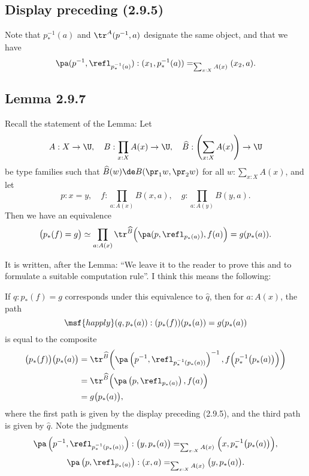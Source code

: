 \documentclass[12pt]{article}
\begin{document}

\subsection{Display preceding (2.9.5)}

Note that $p^{-1}_*(a)$ and $\tr^A(p^{-1},a)$ designate the same object, and that we have 
$$
\pa(p^{-1},\refl_{p^{-1}_*(a)}):(x_1,p^{-1}_*(a))=_{\sum_{x:X}A(x)}(x_2,a).
$$ 


\subsection{Lemma 2.9.7}

Recall the statement of the Lemma: Let 
$$
A:X\to\U,\quad B:\prod_{x:X}A(x)\to\U,\quad\widehat B:\left(\sum_{x:X}A(x)\right)\to\U
$$ 
be type families such that $\widehat B(w)\de B(\pr_1w,\pr_2w)$ for all $w:\sum_{x:X}A(x)$, and let 
$$
p:x=y,\quad f:\prod_{a:A(x)}B(x,a),\quad g:\prod_{a:A(y)}B(y,a).
$$ 
Then we have an equivalence 
$$
\big(p_*(f)=g\big)\simeq\prod_{a:A(x)}\tr^{\widehat B}\Big(\pa(p,\refl_{p_*(a)}),f(a)\Big)=g(p_*(a)).
$$ 

It is written, after the Lemma: ``We leave it to the reader to prove this and to formulate a suitable computation rule''. I think this means the following:

If $q:p_*(f)=g$ corresponds under this equivalence to $\widehat q$, then for $a:A(x)$, the path 
$$
\msf{happly}(q,p_*(a)):(p_*(f))(p_*(a))=g(p_*(a))
$$ 
is equal to the composite 
\begin{align*}
\big(p_*(f)\big)\big(p_*(a)\big)&=\tr^{\widehat B}\bigg(\pa\left(p^{-1},\refl_{p^{-1}_*(p_*(a))}\right)^{-1},f\Big(p^{-1}_*\big(p_*(a)\big)\Big)\bigg)\\ 
&=\tr^{\widehat B}\Big(\pa\left(p,\refl_{p_*(a)}\right),f(a)\Big)\\
&=g\big(p_*(a)\big),
\end{align*}
where the first path is given by the display preceding (2.9.5), and the third path is given by $\widehat q$. Note the judgments
$$
\pa\left(p^{-1},\refl_{p^{-1}_*(p_*(a))}\right):\big(y,p_*(a)\big)=_{\sum_{x:X}A(x)}\Big(x,p^{-1}_*\big(p_*(a)\big)\Big),
$$ 
$$
\pa\left(p,\refl_{p_*(a)}\right):(x,a)=_{\sum_{x:X}A(x)}\big(y,p_*(a)\big).
$$ 
\end{document}
